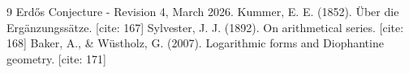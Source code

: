 \documentclass[11pt,a4paper]{article}
\begin{document}
	\begin{thebibliography}{9}
		 Erdős Conjecture - Revision 4, March 2026. 
		 Kummer, E. E. (1852). Über die Ergänzungssätze. [cite: 167]
		 Sylvester, J. J. (1892). On arithmetical series. [cite: 168]
		 Baker, A., \& Wüstholz, G. (2007). Logarithmic forms and Diophantine geometry. [cite: 171]
	\end{thebibliography}
	
\end{document}
